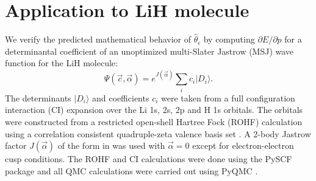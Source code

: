 \documentclass[twocolumn]{revtex4-1}
\begin{document}
\section{Application to LiH molecule}
We verify the predicted mathematical behavior of $\hat{\theta}_\epsilon$ by computing $\partial E/\partial p$ for a determinantal coefficient of an unoptimized multi-Slater Jastrow (MSJ) wave function for the LiH molecule:
\begin{equation}
\Psi(\vec{c}, \vec{\alpha}) = e^{J(\vec{\alpha})} \sum_{i} c_i  |D_i \rangle.
\end{equation}
The determinants $|D_i \rangle$ and coefficients $c_i$ were taken from a full configuration interaction (CI) expansion over the Li 1s, 2s, 2p and H 1s orbitals.
The orbitals were constructed from a restricted open-shell Hartree Fock (ROHF) calculation using a correlation consistent quadruple-zeta valence basis set \cite{doi:10.1063/1.456153}.
A 2-body Jastrow factor $J(\vec{\alpha})$ of the form in \cite{Wagner2009} was used with $\vec{\alpha} = 0$ except for electron-electron cusp conditions.
The ROHF and CI calculations were done using the PySCF package \cite{PYSCF} and all QMC calculations were carried out using PyQMC \cite{pyqmc}.
\end{document}
